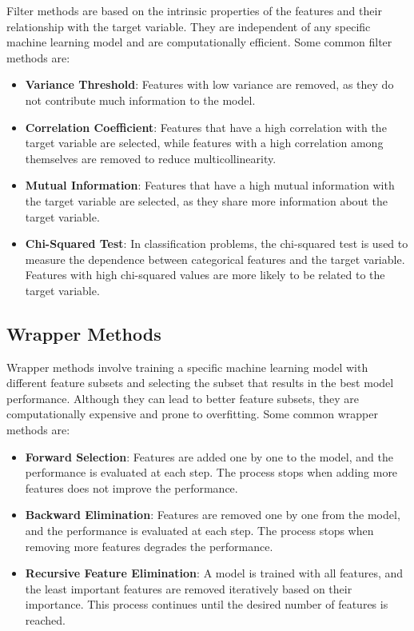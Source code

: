 \documentclass[12pt]{article}
\begin{document}
Filter methods are based on the intrinsic properties of the features and their relationship with the target variable. They are independent of any specific machine learning model and are computationally efficient. Some common filter methods are:

\begin{itemize}
\item \textbf{Variance Threshold}: Features with low variance are removed, as they do not contribute much information to the model.
\item \textbf{Correlation Coefficient}: Features that have a high correlation with the target variable are selected, while features with a high correlation among themselves are removed to reduce multicollinearity.
\item \textbf{Mutual Information}: Features that have a high mutual information with the target variable are selected, as they share more information about the target variable.
\item \textbf{Chi-Squared Test}: In classification problems, the chi-squared test is used to measure the dependence between categorical features and the target variable. Features with high chi-squared values are more likely to be related to the target variable.
\end{itemize}

\subsection{Wrapper Methods}

Wrapper methods involve training a specific machine learning model with different feature subsets and selecting the subset that results in the best model performance. Although they can lead to better feature subsets, they are computationally expensive and prone to overfitting. Some common wrapper methods are:

\begin{itemize}
\item \textbf{Forward Selection}: Features are added one by one to the model, and the performance is evaluated at each step. The process stops when adding more features does not improve the performance.
\item \textbf{Backward Elimination}: Features are removed one by one from the model, and the performance is evaluated at each step. The process stops when removing more features degrades the performance.
\item \textbf{Recursive Feature Elimination}: A model is trained with all features, and the least important features are removed iteratively based on their importance. This process continues until the desired number of features is reached.
\end{itemize}
\end{document}
